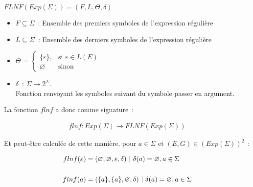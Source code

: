 \begin{center}
    \(FLNF(Exp(\Sigma)) = (F, L, \Theta, \delta)\)

    \begin{itemize}
        \item[\textbullet] \(F \subseteq \Sigma\)~: Ensemble des premiers
            symboles de l'expression régulière

            \vphantom{}

        \item[\textbullet] \(L \subseteq \Sigma\)~: Ensemble des derniers
            symboles de l'expression régulière

            \vphantom{}

        \item[\textbullet] \(\Theta\) =
            \(
            \begin{cases}
                \{ \varepsilon \}, & \text{si } \varepsilon \in L(E) \\
                \varnothing        & \text{sinon}
            \end{cases}
            \)

            \vphantom{}

        \item[\textbullet] \(\delta\)~: \(\Sigma \to 2^{\Sigma}\). \\
            Fonction renvoyant les symboles suivant du symbole passer en argument.
    \end{itemize}
\end{center}

La fonction \(flnf\) a donc comme signature~:

\begin{align*}
    flnf: Exp(\Sigma) \to FLNF(Exp(\Sigma))
\end{align*}

Et peut-être calculée de cette manière, pour \(a \in \Sigma\) et \((E, G) \in
(Exp(\Sigma))^2\)~:

\begin{align*}
    flnf(\varepsilon) & = (\varnothing, \varnothing, \varepsilon, \delta) ~|~ \delta(a) = \varnothing, a \in \Sigma \\
    \vphantom{} \notag                                                                                              \\
    flnf(a)           & = (\{a\}, \{a\}, \varnothing, \delta) ~|~ \delta(a) = \varnothing, a
    \in \Sigma
\end{align*}

